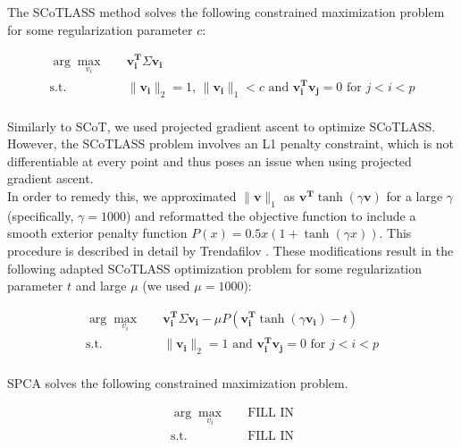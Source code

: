 \documentclass[12pt,letterpaper]{report}
\begin{document}
The SCoTLASS method solves the following constrained maximization problem for some regularization parameter $c$:

\begin{equation}
\begin{aligned}
\arg\max_{v_{i}} \quad & \mathbf{v_{i}^{T}}\Sigma \mathbf{v_{i}}\\
\textrm{s.t.} \quad & \lVert \mathbf{v_{i}} \rVert_{2} = 1 \text{, }
            \lVert \mathbf{v_{i}} \rVert_{1} < c \text{ and } \mathbf{v_{i}^{T}}\mathbf{v_{j}} = 0 \text{ for }  j < i < p \\
\end{aligned}
\end{equation}

Similarly to SCoT, we used projected gradient ascent to optimize SCoTLASS. However, the SCoTLASS problem involves an L1 penalty constraint, which is not differentiable at every point and thus poses an issue when using projected gradient ascent. \\

In order to remedy this, we approximated $\lVert \mathbf{v}\rVert_{1}$ as $\mathbf{v^T}\tanh{(\gamma \mathbf{v})}$ for a large $\gamma$ (specifically, $\gamma = 1000$) and reformatted the objective function to include a smooth exterior penalty function $P(x) = 0.5x(1+\tanh{(\gamma x)})$. This procedure is described in detail by Trendafilov \citeyear{Trendafilov2004}. These modifications result in the following adapted SCoTLASS optimization problem for some regularization parameter $t$ and large $\mu$ (we used $\mu = 1000$):

\begin{equation}
\begin{aligned}
\arg\max_{v_{i}} \quad & \mathbf{v_{i}^{T}}\Sigma \mathbf{v_{i}} - \mu P(\mathbf{v_{i}^T} \tanh{(\gamma\mathbf{v_{i}})} - t)\\
\textrm{s.t.} \quad & \lVert \mathbf{v_{i}} \rVert_{2} = 1 \text { and } \mathbf{v_{i}^{T}}\mathbf{v_{j}} = 0 \text{ for }  j < i < p \\
\end{aligned}
\end{equation}

SPCA solves the following constrained maximization problem.

\begin{equation}
\begin{aligned}
\arg\max_{v_{i}} \quad & \text{FILL IN}\\
\textrm{s.t.} \quad & \text{FILL IN}\\
\end{aligned}
\end{equation}
\end{document}
